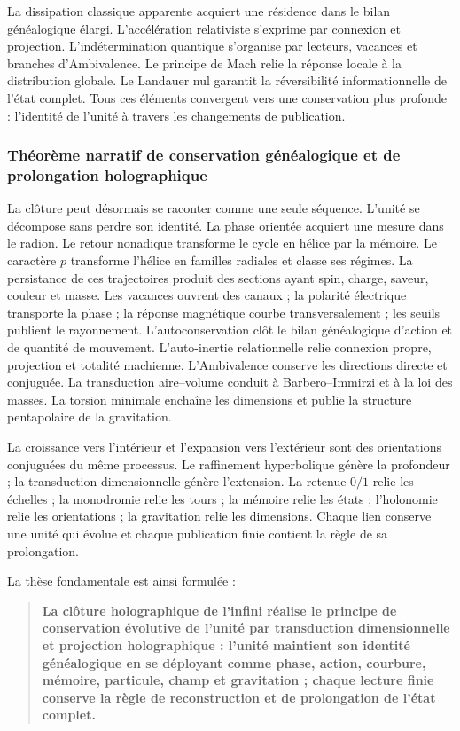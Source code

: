 La dissipation classique apparente acquiert une résidence dans le bilan généalogique élargi. L'accélération relativiste s'exprime par connexion et projection. L'indétermination quantique s'organise par lecteurs, vacances et branches d'Ambivalence. Le principe de Mach relie la réponse locale à la distribution globale. Le Landauer nul garantit la réversibilité informationnelle de l'état complet. Tous ces éléments convergent vers une conservation plus profonde : l'identité de l'unité à travers les changements de publication.

\subsubsection{Théorème narratif de conservation généalogique et de prolongation holographique}

La clôture peut désormais se raconter comme une seule séquence. L'unité se décompose sans perdre son identité. La phase orientée acquiert une mesure dans le radion. Le retour nonadique transforme le cycle en hélice par la mémoire. Le caractère \(p\) transforme l'hélice en familles radiales et classe ses régimes. La persistance de ces trajectoires produit des sections ayant spin, charge, saveur, couleur et masse. Les vacances ouvrent des canaux ; la polarité électrique transporte la phase ; la réponse magnétique courbe transversalement ; les seuils publient le rayonnement. L'autoconservation clôt le bilan généalogique d'action et de quantité de mouvement. L'auto-inertie relationnelle relie connexion propre, projection et totalité machienne. L'Ambivalence conserve les directions directe et conjuguée. La transduction aire–volume conduit à Barbero–Immirzi et à la loi des masses. La torsion minimale enchaîne les dimensions et publie la structure pentapolaire de la gravitation.

La croissance vers l'intérieur et l'expansion vers l'extérieur sont des orientations conjuguées du même processus. Le raffinement hyperbolique génère la profondeur ; la transduction dimensionnelle génère l'extension. La retenue \(0/1\) relie les échelles ; la monodromie relie les tours ; la mémoire relie les états ; l'holonomie relie les orientations ; la gravitation relie les dimensions. Chaque lien conserve une unité qui évolue et chaque publication finie contient la règle de sa prolongation.

La thèse fondamentale est ainsi formulée :

\begin{quote}
\textbf{La clôture holographique de l'infini réalise le principe de conservation évolutive de l'unité par transduction dimensionnelle et projection holographique : l'unité maintient son identité généalogique en se déployant comme phase, action, courbure, mémoire, particule, champ et gravitation ; chaque lecture finie conserve la règle de reconstruction et de prolongation de l'état complet.}
\end{quote}

